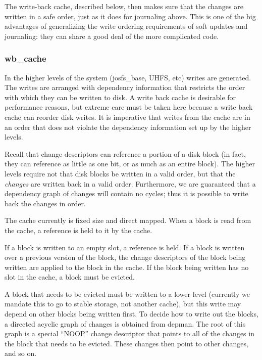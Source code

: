 The write-back cache, described below, then makes sure that the changes are
written in a safe order, just as it does for journaling above. This is one of
the big advantages of generalizing the write ordering requirements of soft
updates and journaling: they can share a good deal of the more complicated
code.

\subsubsection{wb\_cache}
\label{sec:solution:impl:wbcache}

In the higher levels of the system (josfs\_base, UHFS, etc) writes are
generated. The writes are arranged with dependency information that restricts
the order with which they can be written to disk. A write back cache is
desirable for performance reasons, but extreme care must be taken here because a
write back cache can reorder disk writes. It is imperative that writes from the
cache are in an order that does not violate the dependency information set up by
the higher levels.

Recall that change descriptors can reference a portion of a disk block (in fact,
they can reference as little as one bit, or as much as an entire block). The
higher levels require not that disk blocks be written in a valid order, but that
the \emph{changes} are written back in a valid order. Furthermore, we are
guaranteed that a dependency graph of changes will contain no cycles; thus it is
possible to write back the changes in order.

The cache currently is fixed size and direct mapped. When a block is read from
the cache, a reference is held to it by the cache.

If a block is written to an empty slot, a reference is held. If a block is
written over a previous version of the block, the change descriptors of the
block being written are applied to the block in the cache. If the block being
written has no slot in the cache, a block must be evicted.

A block that needs to be evicted must be written to a lower level (currently we
mandate this to go to stable storage, not another cache), but this write may
depend on other blocks being written first. To decide how to write out the
blocks, a directed acyclic graph of changes is obtained from depman. The root of
this graph is a special ``NOOP'' change descriptor that points to all of the
changes in the block that needs to be evicted. These changes then point to
other changes, and so on.

